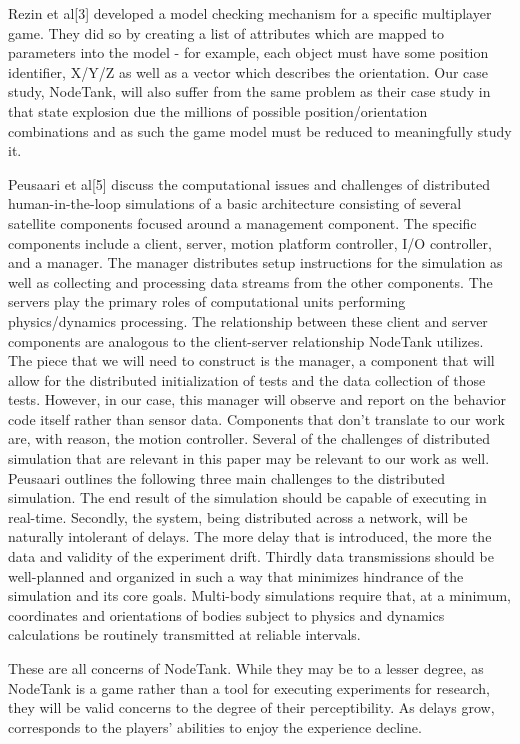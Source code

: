 \documentclass[conference]{IEEEtran}
\begin{document}
Rezin et al[3] developed a model checking mechanism for a specific multiplayer game. They did so by creating a list of attributes which are mapped to parameters into the model -
 for example, each object must have some position identifier, X/Y/Z as well as a vector which describes the orientation. Our case study, NodeTank, will also suffer from the same
 problem as their case study in that state explosion due the millions of possible position/orientation combinations and as such the game model must be reduced to meaningfully study it.

Peusaari et al[5] discuss the computational issues and challenges of distributed human-in-the-loop simulations of a basic architecture consisting of several satellite components
focused around a management component. The specific components include a client, server, motion platform controller, I/O controller, and a manager. The manager distributes setup
instructions for the simulation as well as collecting and processing data  streams from the other components. The servers play the primary roles of computational units performing
physics/dynamics processing. The relationship between these client and server components are analogous to the client-server relationship NodeTank utilizes. The piece that we will
need to construct is the manager, a component that will allow for the distributed initialization of tests and the data collection of those tests. However, in our case, this manager
will observe and report on the behavior code itself rather than sensor data. Components that don’t translate to our work are, with reason, the motion controller. Several of the
challenges of distributed simulation that are relevant in this paper may be relevant to our work as well. Peusaari outlines the following three main challenges to the distributed
simulation. The end result of the simulation should be capable of executing in real-time. Secondly, the system, being distributed across a network, will be naturally intolerant of
delays. The more delay that is introduced, the more the data and validity of the experiment drift. Thirdly data transmissions should be well-planned and organized in such a way that
minimizes hindrance of the simulation and its core goals. Multi-body simulations require that, at a minimum, coordinates and orientations of bodies subject to physics and dynamics
calculations be routinely transmitted at reliable intervals.

These are all concerns of NodeTank. While they may be to a lesser degree, as NodeTank is a game rather than a tool for executing experiments for research, they will be valid concerns
 to the degree of their perceptibility. As delays grow, corresponds to the players’ abilities to enjoy the experience decline.
\end{document}
